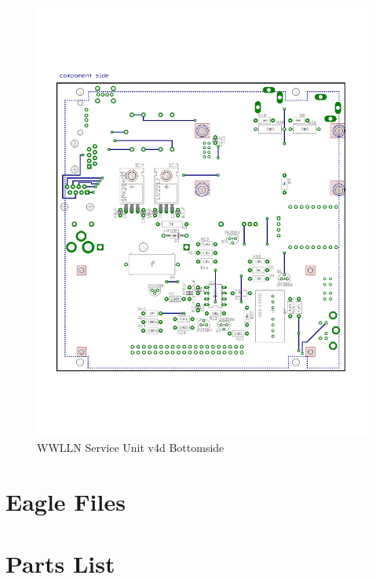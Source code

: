 \begin{figure}[ht!]
   \centering
   \includegraphics[scale=.75]{Appendix/Figures/wwlln_SU_v4_bottom.pdf} 
   \caption{WWLLN Service Unit v4d Bottomside}
   \label{app:suBot}
\end{figure}

\section{Eagle Files}

\section{Parts List}

